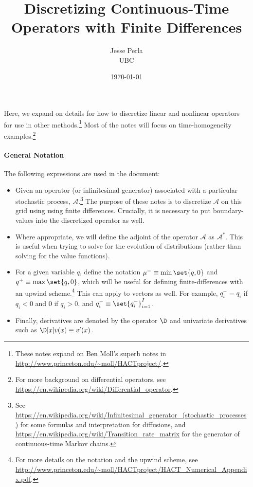 \documentclass[11pt]{etk-article}
\begin{document}
\title{Discretizing Continuous-Time Operators with Finite Differences}
\author{Jesse Perla\\UBC}
\date{\today}
\maketitle
 Here, we expand on details for how to discretize linear and nonlinear operators for use in other methods.\footnote{These notes expand on Ben Moll's superb notes in \url{http://www.princeton.edu/~moll/HACTproject/}. }  Most of the notes will focus on time-homogeneity examples.\footnote{For more background on differential operators, see \url{https://en.wikipedia.org/wiki/Differential_operator}.}
\paragraph{General Notation} The following expressions are used in the document:
\begin{itemize}
	\item Given an operator (or infinitesimal generator) associated with a particular stochastic process, $\mathcal{A}$.\footnote{See \url{https://en.wikipedia.org/wiki/Infinitesimal_generator_(stochastic_processes)} for some formulas and interpretation for diffusions, and \url{https://en.wikipedia.org/wiki/Transition_rate_matrix} for the generator of continuous-time Markov chains.}  The purpose of these notes is to discretize $\mathcal{A}$ on this grid using using finite differences.  Crucially, it is necessary to put boundary-values into the discretized operator as well. 
	\item Where appropriate, we will define the adjoint of the operator $\mathcal{A}$ as $\mathcal{A}^*$.  This is useful when trying to solve for the evolution of distributions (rather than solving for the value functions).
	\item For a given variable $q$, define the notation $\mu^{-} \equiv \min\set{q,0}$ and $q^{+} \equiv \max\set{q,0}$, which will be useful for defining finite-differences with an upwind scheme.\footnote{For more details on the notation and the upwind scheme, see \url{http://www.princeton.edu/~moll/HACTproject/HACT_Numerical_Appendix.pdf}.}   This can apply to vectors as well. For example, $q_i^{-} = q_i$ if $q_i < 0$ and $0$ if $q_i > 0$, and $q_i^{-} \equiv \set{q^{-}_i}_{i=1}^{I}$.
	\item Finally,  derivatives are denoted by the operator $\D$ and univariate derivatives such as $\D[x]v(x) \equiv v'(x)$.	
\end{itemize}
\end{document}
